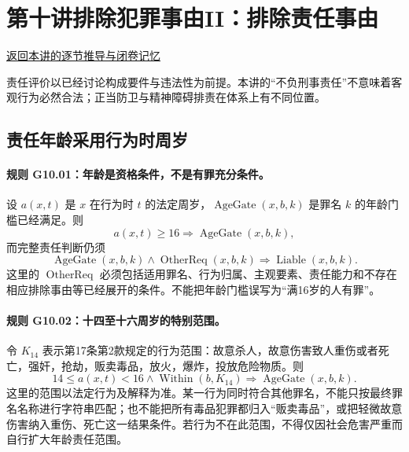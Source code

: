 \section{第十讲\quad 排除犯罪事由II：排除责任事由}

\label{ref:lecture:10}

\noindent\hyperref[lecture:10]{返回本讲的逐节推导与闭卷记忆}

责任评价以已经讨论构成要件与违法性为前提。本讲的“不负刑事责任”不意味着客观行为必然合法；正当防卫与精神障碍排责在体系上有不同位置。

\subsection{责任年龄采用行为时周岁}
\paragraph{规则 G10.01：年龄是资格条件，不是有罪充分条件。}
设 $a(x,t)$ 是 $x$ 在行为时 $t$ 的法定周岁，$\operatorname{AgeGate}(x,b,k)$ 是罪名 $k$ 的年龄门槛已经满足。则
\[
a(x,t)\ge16\Longrightarrow\operatorname{AgeGate}(x,b,k),
\]
而完整责任判断仍须
\[
\operatorname{AgeGate}(x,b,k)\land\operatorname{OtherReq}(x,b,k)
\Longrightarrow\operatorname{Liable}(x,b,k).
\]
这里的 $\operatorname{OtherReq}$ 必须包括适用罪名、行为归属、主观要素、责任能力和不存在相应排除事由等已经展开的条件。不能把年龄门槛误写为“满16岁的人有罪”。

\paragraph{规则 G10.02：十四至十六周岁的特别范围。}
令 $K_{14}$ 表示第17条第2款规定的行为范围：故意杀人，故意伤害致人重伤或者死亡，强奸，抢劫，贩卖毒品，放火，爆炸，投放危险物质。则
\[
14\le a(x,t)<16\land\operatorname{Within}(b,K_{14})
\Longrightarrow\operatorname{AgeGate}(x,b,k).
\]
这里的范围以法定行为及解释为准。某一行为同时符合其他罪名，不能只按最终罪名名称进行字符串匹配；也不能把所有毒品犯罪都归入“贩卖毒品”，或把轻微故意伤害纳入重伤、死亡这一结果条件。若行为不在此范围，不得仅因社会危害严重而自行扩大年龄责任范围。

